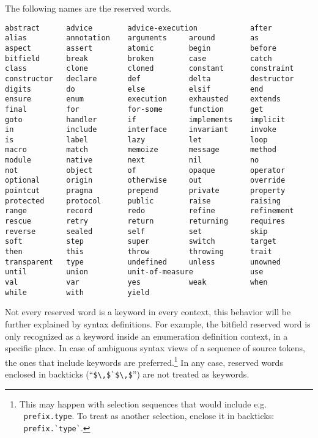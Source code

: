 The following names are the reserved words.

\begin{lstlisting}
abstract      advice        advice-execution            after
alias         annotation    arguments     around        as
aspect        assert        atomic        begin         before
bitfield      break         broken        case          catch
class         clone         cloned        constant      constraint
constructor   declare       def           delta         destructor
digits        do            else          elsif         end
ensure        enum          execution     exhausted     extends
final         for           for-some      function      get
goto          handler       if            implements    implicit
in            include       interface     invariant     invoke
is            label         lazy          let           loop
macro         match         memoize       message       method
module        native        next          nil           no
not           object        of            opaque        operator
optional      origin        otherwise     out           override
pointcut      pragma        prepend       private       property
protected     protocol      public        raise         raising
range         record        redo          refine        refinement
rescue        retry         return        returning     requires
reverse       sealed        self          set           skip
soft          step          super         switch        target
then          this          throw         throwing      trait
transparent   type          undefined     unless        unowned
until         union         unit-of-measure             use
val           var           yes           weak          when
while         with          yield
\end{lstlisting}

Not every reserved word is a keyword in every context, this behavior will be further explained by syntax definitions. For example, the bitfield reserved word is only recognized as a keyword inside an enumeration definition context, in a specific place. In case of ambiguous syntax views of a sequence of source tokens, the ones that include keywords are preferred.\footnote{This may happen with selection sequences that would include e.g. ~\lstinline!prefix.type!. To treat  as another selection, enclose it in backticks: ~\lstinline[deletekeywords={type}]!prefix.`type`!.} In any case, reserved words enclosed in backticks (``\lstinline!$\,$`$\,$!'') are not treated as keywords. 






